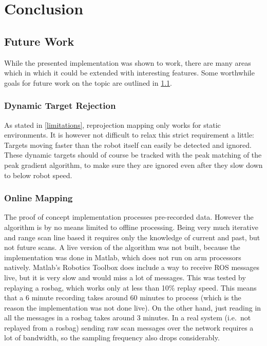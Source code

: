 \chapter{Conclusion}\label{conclusion}

\section{Future Work}\label{future-work}

While the presented implementation was shown to work, there are many areas which in which it could be extended with interesting features. Some worthwhile goals for future work on the topic are outlined in \cref{future-work}.


\subsection{Dynamic Target Rejection}\label{dynamic-target-rejection}
As stated in \cref{limitations}, reprojection mapping only works for static environments. It is however not difficult to relax this strict requirement a little: Targets moving faster than the robot itself can easily be detected and ignored. These dynamic targets should of course be tracked with the peak matching of the peak gradient algorithm, to make sure they are ignored even after they slow down to below robot speed.


\subsection{Online Mapping}\label{online-mapping}
The proof of concept implementation processes pre-recorded data. However
the algorithm is by no means limited to offline processing. Being very
much iterative and range scan line based it requires only the knowledge
of current and past, but not future scans. A live version of the
algorithm was not built, because the implementation was done in Matlab,
which does not run on arm processors natively. Matlab's Robotics Toolbox
does include a way to receive ROS messages live, but it is very slow and
would miss a lot of messages. This was tested by replaying a rosbag,
which works only at less than 10\% replay speed. This means that a 6
minute recording takes around 60 minutes to process (which is the reason the implementation was not done live). On the other hand, just reading in all the messages in a rosbag takes around 3 minutes. In a real system (i.e.~not replayed from a rosbag) sending raw scan messages over the network requires a lot of bandwidth, so the sampling frequency also drops considerably.

